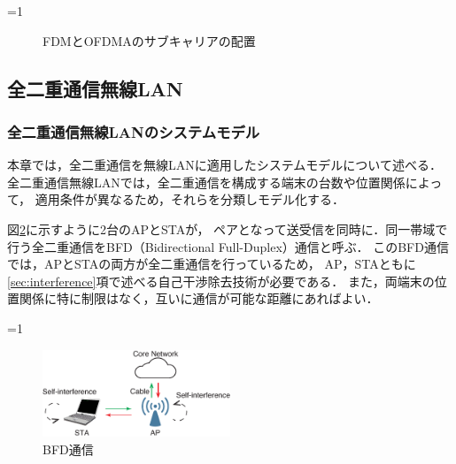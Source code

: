 \documentclass[master]{kuisthesis}		%
\newcounter{flagFig}
\begin{document}
			\ifnum\value{flagFig}=1 {\begin{figure}[t]
				\centering
				\hspace{20pt}
				\caption{FDMとOFDMAのサブキャリアの配置}
				\label{fig:ofdm_ofdma}
			\end{figure}}\fi
	\subsection{全二重通信無線LAN}
		\subsubsection{全二重通信無線LANのシステムモデル}
			本章では，全二重通信を無線LANに適用したシステムモデルについて述べる．
			全二重通信無線LANでは，全二重通信を構成する端末の台数や位置関係によって，
			適用条件が異なるため，それらを分類しモデル化する．
			\par
			図\ref{fig:model_pair}に示すように2台のAPとSTAが，
			ペアとなって送受信を同時に．同一帯域で行う全二重通信をBFD（Bidirectional Full-Duplex）通信と呼ぶ．
			このBFD通信では，APとSTAの両方が全二重通信を行っているため，
			AP，STAともに\ref{sec:interference}項で述べる自己干渉除去技術が必要である．
			また，両端末の位置関係に特に制限はなく，互いに通信が可能な距離にあればよい．

			\ifnum\value{flagFig}=1 {\begin{figure}[t]
				\begin{center}
					\includegraphics[width=0.5\textwidth]{fig/bfd.eps}
					\caption{BFD通信}
					\label{fig:model_pair}
				\end{center}
			\end{figure}}\fi
\end{document}
